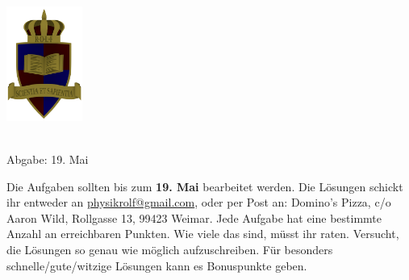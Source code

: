 \documentclass[a4paper]{article}
\begin{document}
	\vspace*{-2cm}
	\parbox{4cm}{\includegraphics[width=2.5cm]{../images/ROLF4.png}}
	\parbox{10.6cm}{ \\ Abgabe: 19. Mai \\ \vspace*{-.5cm} }
	
	

\thispagestyle{empty}
\begin{framed}
	\noindent
	\scriptsize
	Die Aufgaben sollten bis zum \textbf{19. Mai} bearbeitet werden. Die Lösungen schickt ihr entweder an \href{mailto:physikrolf@gmail.com}{physikrolf@gmail.com}, oder per Post an: Domino's Pizza, c/o Aaron Wild, Rollgasse 13, 99423 Weimar.
	Jede Aufgabe hat eine bestimmte Anzahl an erreichbaren Punkten. Wie viele das sind, müsst ihr raten. Versucht, die Lösungen so genau wie möglich aufzuschreiben. Für besonders schnelle/gute/witzige Lösungen kann es Bonuspunkte geben.

\end{framed}

\noindent




\end{document}
